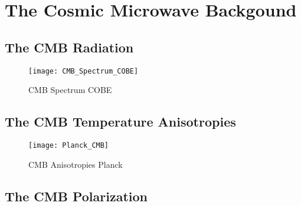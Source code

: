 \chapter{The Cosmic Microwave Backgound}

\section{The CMB Radiation}

\begin{figure}
        \centering
        \texttt{[image: CMB\_Spectrum\_COBE]}
        \caption{CMB Spectrum COBE}
        \label{fig:cmb_spectrum_cobe}
\end{figure}

\section{The CMB Temperature Anisotropies}

\begin{figure}
        \centering
        \texttt{[image: Planck\_CMB]}
        \caption{CMB Anisotropies Planck}
        \label{fig:plack_cmb}
\end{figure}

\section{The CMB Polarization}
